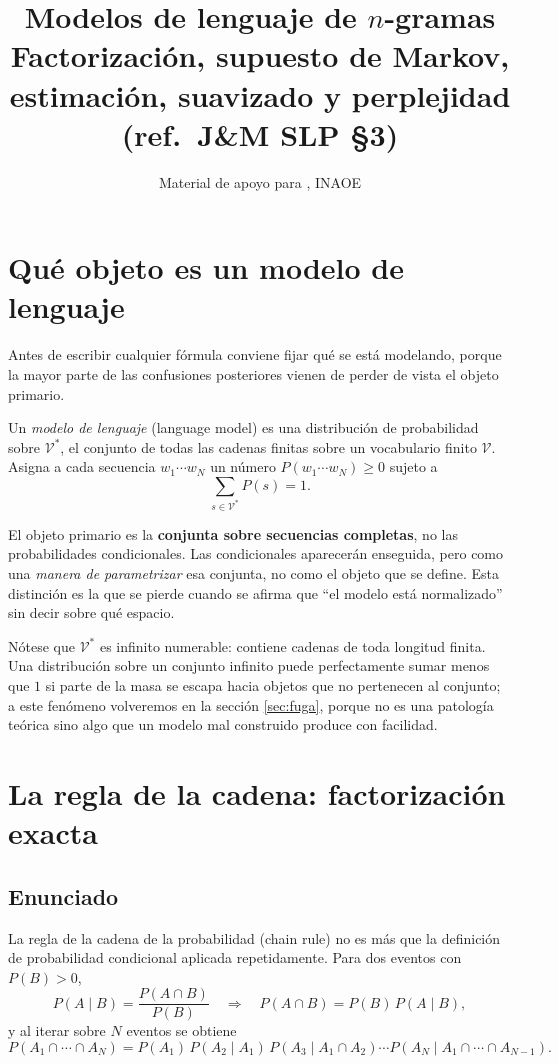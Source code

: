 \documentclass[11pt,letterpaper]{article}
\title{\textbf{Modelos de lenguaje de $n$-gramas}\\[2pt]
  \large Factorización, supuesto de Markov, estimación, suavizado y
  perplejidad (ref.\ J\&M SLP \S3)}
\author{Material de apoyo para \materia, INAOE}
\date{}
\newcommand{\Vocab}{\mathcal{V}}
\begin{document}
\maketitle

\section{Qué objeto es un modelo de lenguaje}

Antes de escribir cualquier fórmula conviene fijar qué se está modelando, porque
la mayor parte de las confusiones posteriores vienen de perder de vista el
objeto primario.

\begin{definicion}
Un \emph{modelo de lenguaje} (language model) es una distribución de
probabilidad sobre $\Vocab^*$, el conjunto de todas las cadenas finitas sobre un
vocabulario finito $\Vocab$. Asigna a cada secuencia $w_1\cdots w_N$ un número
$P(w_1\cdots w_N)\ge 0$ sujeto a
\[
\sum_{s\in\Vocab^*} P(s) = 1 .
\]
\end{definicion}

\begin{idea}[title={Lo que hay que retener de entrada}]
El objeto primario es la \textbf{conjunta sobre secuencias completas}, no las
probabilidades condicionales. Las condicionales aparecerán enseguida, pero como
una \emph{manera de parametrizar} esa conjunta, no como el objeto que se define.
Esta distinción es la que se pierde cuando se afirma que ``el modelo está
normalizado'' sin decir sobre qué espacio.
\end{idea}

Nótese que $\Vocab^*$ es infinito numerable: contiene cadenas de toda longitud
finita. Una distribución sobre un conjunto infinito puede perfectamente sumar
menos que $1$ si parte de la masa se escapa hacia objetos que no pertenecen al
conjunto; a este fenómeno volveremos en la sección \ref{sec:fuga}, porque no es
una patología teórica sino algo que un modelo mal construido produce con
facilidad.

\section{La regla de la cadena: factorización exacta}

\subsection{Enunciado}

La regla de la cadena de la probabilidad (chain rule) no es más que la
definición de probabilidad condicional aplicada repetidamente. Para dos eventos
con $P(B)>0$,
\[
P(A\mid B)=\frac{P(A\cap B)}{P(B)}
\quad\Longrightarrow\quad
P(A\cap B) = P(B)\,P(A\mid B),
\]
y al iterar sobre $N$ eventos se obtiene
\[
P(A_1\cap\cdots\cap A_N)
= P(A_1)\,P(A_2\mid A_1)\,P(A_3\mid A_1\cap A_2)\cdots P(A_N\mid
A_1\cap\cdots\cap A_{N-1}).
\]
\end{document}
